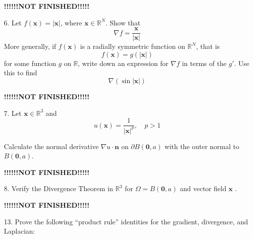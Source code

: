 \documentclass{article}
\begin{document}
\quad \textbf{!!!!!!NOT FINISHED!!!!!}

6. Let $f(\mathbf{x}) = |\mathbf{x}|$, where $\mathbf{x} \in \mathbb{R}^{N}$.
Show that $$\nabla f = \frac{\mathbf{x}}{|\mathbf{x}|}$$ More generally,
if $f(\mathbf{x})$ is a radially symmetric function on $\mathbb{R}^{N}$,
that is $$f(\mathbf{x}) = g(|\mathbf{x}|)$$ for some function $g$ on
$\mathbb{R}$, write down an expression for $\nabla f$ in terms of the $g'$.
Use this to find $$\nabla(\sin |\mathbf{x}|)$$

\quad \textbf{!!!!!!NOT FINISHED!!!!!}

7. Let $\mathbf{x} \in \mathbb{R}^{3}$ and
$$u(\mathbf{x}) = \frac{1}{|\mathbf{x}|^{p}}, \quad p>1$$

Calculate the normal derivative $\nabla u \cdot \mathbf{n}$ on $\partial
B(\mathbf{0}, a)$ with the outer normal to $B(\mathbf{0}, a)$.

\quad \textbf{!!!!!!NOT FINISHED!!!!!}

8. Verify the Divergence Theorem in $\mathbb{R}^{3}$ for
$\Omega = B(\mathbf{0}, a)$ and vector field $\mathbf{x}$ .

\quad \textbf{!!!!!!NOT FINISHED!!!!!}

13. Prove the following ``product rule'' identities for the gradient,
divergence, and Laplacian:
\end{document}
